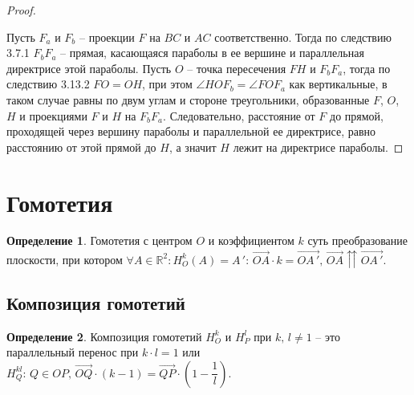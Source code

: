 \documentclass[12pt]{article}
\theoremstyle{definition}
\newtheorem{definition}{Определение}
\newcommand{\R}{\mathbb{R}}
\begin{document}
\begin{proof}
\begin{center}
        \end{center}
        Пусть $F_a$ и $F_b$ -- проекции $F$ на $BC$ и $AC$ соответственно. Тогда по следствию 3.7.1 $F_bF_a$ -- прямая, касающаяся параболы в ее вершине и параллельная директрисе этой параболы. Пусть $O$ -- точка пересечения $FH$ и $F_bF_a$, тогда по следствию 3.13.2 $FO=OH$, при этом $\angle HOF_b=\angle FOF_a$ как вертикальные, в таком случае равны по двум углам и стороне треугольники, образованные $F$, $O$, $H$ и проекциями $F$ и $H$ на $F_bF_a$. Следовательно, расстояние от $F$ до прямой, проходящей через вершину параболы и параллельной ее директрисе, равно расстоянию от этой прямой до $H$, а значит $H$ лежит на директрисе параболы.
    \end{proof}

    \section{Гомотетия}

    \begin{definition}
        Гомотетия с центром $O$ и коэффициентом $k$ суть преобразование плоскости, при котором $\forall A \in \R^2: H_O^k(A)=A\,':\,\overrightarrow{OA}\cdot k = \overrightarrow{OA\,'},\,\overrightarrow{OA} \upuparrows \overrightarrow{OA\,'}$.
    \end{definition}

    \setcounter{subsection}{0}
    \subsection{Композиция гомотетий}
    \begin{definition}
        Композиция гомотетий $H_O^k$ и $H_P^l$ при $k,\,l\neq 1$ -- это параллельный перенос при $k\cdot l=1$ или $H_Q^{kl}:\,Q \in OP,\, \overrightarrow{OQ}\cdot (k-1)=\overrightarrow{QP}\cdot \left(1-\dfrac{1}{l}\right)$.
    \end{definition}
\end{document}
